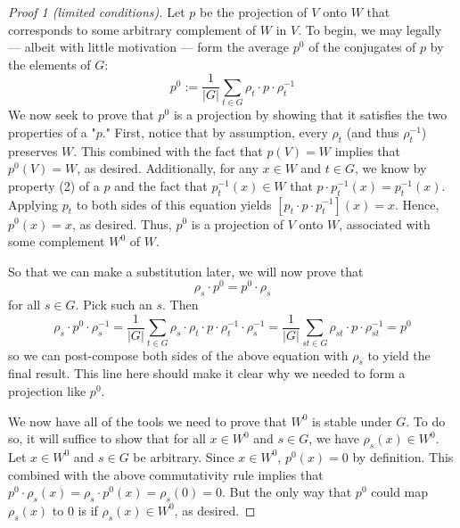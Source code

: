 \documentclass[../notes.tex]{subfiles}
\begin{document}
\begin{itemize}
\begin{theorem}
\begin{proof}[Proof 1 (limited conditions)]
            Let $p$ be the projection of $V$ onto $W$ that corresponds to some arbitrary complement of $W$ in $V$. To begin, we may legally --- albeit with little motivation --- form the average $p^0$ of the conjugates of $p$ by the elements of $G$:
            \begin{equation*}
                p^0 := \frac{1}{|G|}\sum_{t\in G}\rho_t\cdot p\cdot\rho_t^{-1}
            \end{equation*}
            We now seek to prove that $p^0$ is a projection by showing that it satisfies the two properties of a "$p$." First, notice that by assumption, every $\rho_t$ (and thus $\rho_t^{-1}$) preserves $W$. This combined with the fact that $p(V)=W$ implies that $p^0(V)=W$, as desired. Additionally, for any $x\in W$ and $t\in G$, we know by property (2) of a $p$ and the fact that $p_t^{-1}(x)\in W$ that $p\cdot p_t^{-1}(x)=p_t^{-1}(x)$. Applying $p_t$ to both sides of this equation yields $[p_t\cdot p\cdot p_t^{-1}](x)=x$. Hence, $p^0(x)=x$, as desired. Thus, $p^0$ is a projection of $V$ onto $W$, associated with some complement $W^0$ of $W$.\par
            So that we can make a substitution later, we will now prove that
            \begin{equation*}
                \rho_s\cdot p^0 = p^0\cdot\rho_s
            \end{equation*}
            for all $s\in G$. Pick such an $s$. Then
            \begin{equation*}
                \rho_s\cdot p^0\cdot\rho_s^{-1} = \frac{1}{|G|}\sum_{t\in G}\rho_s\cdot\rho_t\cdot p\cdot\rho_t^{-1}\cdot\rho_s^{-1}
                = \frac{1}{|G|}\sum_{st\in G}\rho_{st}\cdot p\cdot\rho_{st}^{-1}
                = p^0
            \end{equation*}
            so we can post-compose both sides of the above equation with $\rho_s$ to yield the final result. This line here should make it clear why we needed to form a projection like $p^0$.\par
            We now have all of the tools we need to prove that $W^0$ is stable under $G$. To do so, it will suffice to show that for all $x\in W^0$ and $s\in G$, we have $\rho_s(x)\in W^0$. Let $x\in W^0$ and $s\in G$ be arbitrary. Since $x\in W^0$, $p^0(x)=0$ by definition. This combined with the above commutativity rule implies that $p^0\cdot\rho_s(x)=\rho_s\cdot p^0(x)=\rho_s(0)=0$. But the only way that $p^0$ could map $\rho_s(x)$ to 0 is if $\rho_s(x)\in W^0$, as desired.
        \end{proof}

\end{theorem}
\end{itemize}
\end{document}
